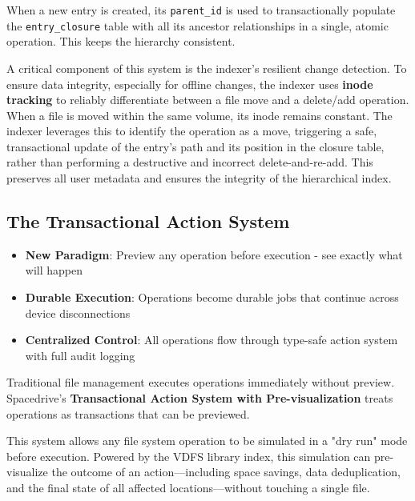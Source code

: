 \documentclass[sigconf]{acmart}
\begin{document}
When a new entry is created, its \texttt{parent\_id} is used to transactionally populate the \texttt{entry\_closure} table with all its ancestor relationships in a single, atomic operation. This keeps the hierarchy consistent.

A critical component of this system is the indexer's resilient change detection. To ensure data integrity, especially for offline changes, the indexer uses \textbf{inode tracking} to reliably differentiate between a file move and a delete/add operation. When a file is moved within the same volume, its inode remains constant. The indexer leverages this to identify the operation as a move, triggering a safe, transactional update of the entry's path and its position in the closure table, rather than performing a destructive and incorrect delete-and-re-add. This preserves all user metadata and ensures the integrity of the hierarchical index.

\subsection{The Transactional Action System}
\label{sec:action-system}

\begin{keytakeaways}
\begin{itemize}[noitemsep, topsep=0pt]
\item \textbf{New Paradigm}: Preview any operation before execution - see exactly what will happen
\item \textbf{Durable Execution}: Operations become durable jobs that continue across device disconnections
\item \textbf{Centralized Control}: All operations flow through type-safe action system with full audit logging
\end{itemize}
\end{keytakeaways}

Traditional file management executes operations immediately without preview. Spacedrive's \textbf{Transactional Action System with Pre-visualization} treats operations as transactions that can be previewed.

This system allows any file system operation to be simulated in a "dry run" mode before execution. Powered by the VDFS library index, this simulation can pre-visualize the outcome of an action---including space savings, data deduplication, and the final state of all affected locations---without touching a single file.
\end{document}

